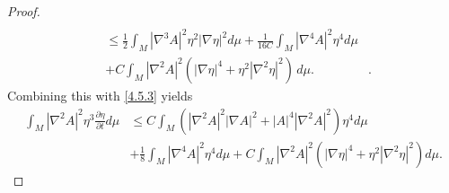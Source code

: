 \documentclass{amsart}
\theoremstyle{definition}
\numberwithin{equation}{section}
\begin{document}
\begin{proof}
\begin{align*}
\\
&\leq \frac 1 2 \int_{M}    \left| \nabla^3 A \right|^2   \eta ^{2} |\nabla \eta|^2   d\mu + \frac 1 {16C} \int_{M}    \left| \nabla^4 A
\right|^2   \eta ^{4}   d\mu  \\
&+ C\int_{M} \left| \nabla^2 A \right|^2  (  |\nabla \eta|^4+\eta^2|\nabla^2\eta|^2)\,  d\mu .
&
\mbox{.}
\end{align*}
Combining this with \eqref{4.5.3} yields
\begin{align}\label{4.5.4}
   \int_{M} \left| \nabla^2 A \right|^{2}  \eta ^{3} \frac{\partial \eta}{\partial t} d\mu &\leq C\int_{M} ( \left| \nabla^2 A \right|^{2}
   |\nabla A|^2+|A|^4|\nabla^2 A|^2)\eta ^4   d\mu \\
&+\frac 1 {8} \int_{M}    \left| \nabla^4 A \right|^2   \eta ^{4}   d\mu+ C\int_{M} \left| \nabla^2 A \right|^2  (  |\nabla
\eta|^4+\eta^2|\nabla^2\eta|^2)  d\mu\nonumber
\mbox{.}
\end{align}


\end{proof}
\end{document}
